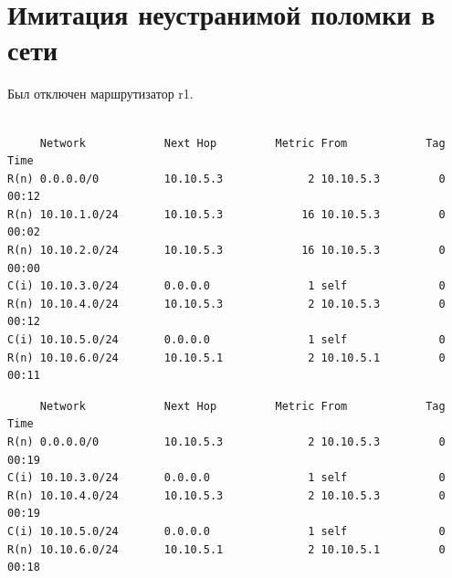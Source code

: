 \documentclass[a4paper,12pt]{article}
\begin{document}
\section{Имитация неустранимой поломки в сети}

Был отключен маршрутизатор r1.
\begin{Verbatim}

     Network            Next Hop         Metric From            Tag Time
R(n) 0.0.0.0/0          10.10.5.3             2 10.10.5.3         0 00:12
R(n) 10.10.1.0/24       10.10.5.3            16 10.10.5.3         0 00:02
R(n) 10.10.2.0/24       10.10.5.3            16 10.10.5.3         0 00:00
C(i) 10.10.3.0/24       0.0.0.0               1 self              0
R(n) 10.10.4.0/24       10.10.5.3             2 10.10.5.3         0 00:12
C(i) 10.10.5.0/24       0.0.0.0               1 self              0
R(n) 10.10.6.0/24       10.10.5.1             2 10.10.5.1         0 00:11
\end{Verbatim}

\begin{Verbatim}
     Network            Next Hop         Metric From            Tag Time
R(n) 0.0.0.0/0          10.10.5.3             2 10.10.5.3         0 00:19
C(i) 10.10.3.0/24       0.0.0.0               1 self              0
R(n) 10.10.4.0/24       10.10.5.3             2 10.10.5.3         0 00:19
C(i) 10.10.5.0/24       0.0.0.0               1 self              0
R(n) 10.10.6.0/24       10.10.5.1             2 10.10.5.1         0 00:18
\end{Verbatim}
\end{document}
